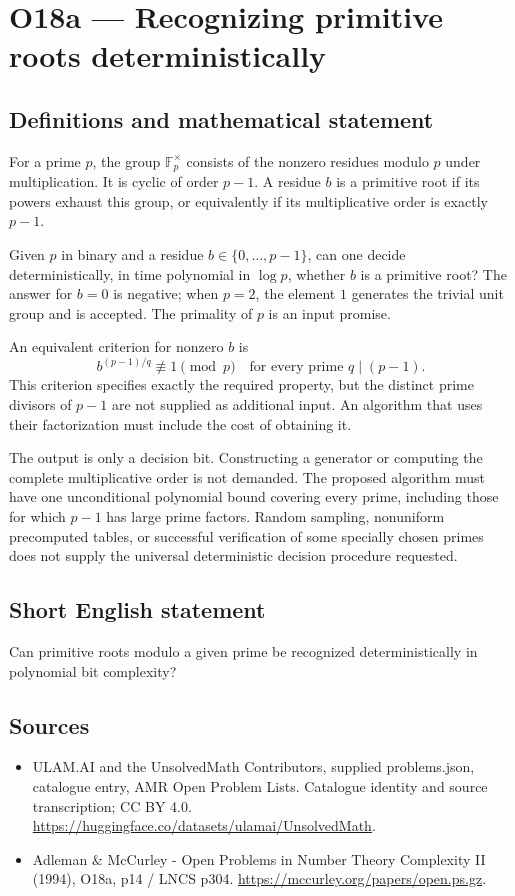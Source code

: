 \documentclass[11pt,a4paper]{article}
\begin{document}
\section*{O18a — Recognizing primitive roots deterministically}\label{statement}

\subsection{Definitions and mathematical statement}
For a prime $p$, the group $\mathbb F_p^\times$ consists of the nonzero residues modulo $p$ under multiplication. It is cyclic of order $p-1$. A residue $b$ is a primitive root if its powers exhaust this group, or equivalently if its multiplicative order is exactly $p-1$.

Given $p$ in binary and a residue $b\in\{0,\ldots,p-1\}$, can one decide deterministically, in time polynomial in $\log p$, whether $b$ is a primitive root? The answer for $b=0$ is negative; when $p=2$, the element $1$ generates the trivial unit group and is accepted. The primality of $p$ is an input promise.

An equivalent criterion for nonzero $b$ is
\[
b^{(p-1)/q}\not\equiv1\pmod p
\quad\text{for every prime }q\mid(p-1).
\]
This criterion specifies exactly the required property, but the distinct prime divisors of $p-1$ are not supplied as additional input. An algorithm that uses their factorization must include the cost of obtaining it.

The output is only a decision bit. Constructing a generator or computing the complete multiplicative order is not demanded. The proposed algorithm must have one unconditional polynomial bound covering every prime, including those for which $p-1$ has large prime factors. Random sampling, nonuniform precomputed tables, or successful verification of some specially chosen primes does not supply the universal deterministic decision procedure requested.
\subsection{Short English statement}
Can primitive roots modulo a given prime be recognized deterministically in polynomial bit complexity?
\subsection{Sources}
\begin{itemize}
\item[S1] ULAM.AI and the UnsolvedMath Contributors, supplied problems.json, catalogue entry, AMR Open Problem Lists. Catalogue identity and source transcription; CC BY 4.0.
\url{https://huggingface.co/datasets/ulamai/UnsolvedMath}.
\item[S2] Adleman \& McCurley - Open Problems in Number Theory Complexity II (1994), O18a, p14 / LNCS p304. 
\url{https://mccurley.org/papers/open.ps.gz}.
\end{itemize}
\end{document}

